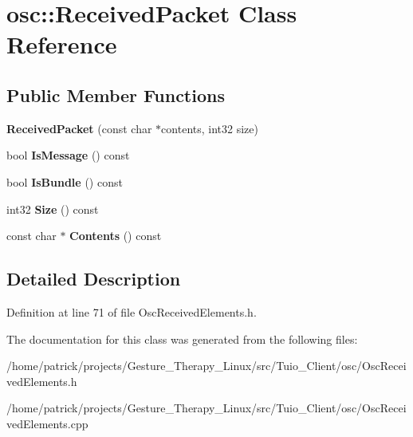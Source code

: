 \hypertarget{classosc_1_1_received_packet}{}\section{osc\+:\+:Received\+Packet Class Reference}
\label{classosc_1_1_received_packet}
\subsection*{Public Member Functions}
\begin{DoxyCompactItemize}
\item 
\mbox{\label{classosc_1_1_received_packet_a347708d35351b2aa5889ebed254721fe}} 
{\bfseries Received\+Packet} (const char $\ast$contents, int32 size)
\item 
\mbox{\label{classosc_1_1_received_packet_ab65e2f3ee8092ed401ace57dbbc1405d}} 
bool {\bfseries Is\+Message} () const
\item 
\mbox{\label{classosc_1_1_received_packet_a41c66212ed692aede38d1a302a5f1296}} 
bool {\bfseries Is\+Bundle} () const
\item 
\mbox{\label{classosc_1_1_received_packet_a2bb997221c96d2b9bebfa89c6ada3c2e}} 
int32 {\bfseries Size} () const
\item 
\mbox{\label{classosc_1_1_received_packet_a1650ac70db88f012f0e0d76f9e76c373}} 
const char $\ast$ {\bfseries Contents} () const
\end{DoxyCompactItemize}


\subsection{Detailed Description}


Definition at line 71 of file Osc\+Received\+Elements.\+h.



The documentation for this class was generated from the following files\+:\begin{DoxyCompactItemize}
\item 
/home/patrick/projects/\+Gesture\+\_\+\+Therapy\+\_\+\+Linux/src/\+Tuio\+\_\+\+Client/osc/Osc\+Received\+Elements.\+h\item 
/home/patrick/projects/\+Gesture\+\_\+\+Therapy\+\_\+\+Linux/src/\+Tuio\+\_\+\+Client/osc/Osc\+Received\+Elements.\+cpp\end{DoxyCompactItemize}
